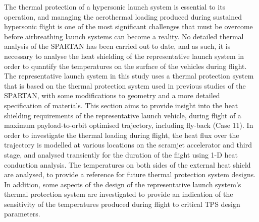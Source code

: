 \noindent
The thermal protection of a hypersonic launch system is essential to its operation, and managing the aerothermal loading produced during sustained hypersonic flight is one of the most significant challenges that must be overcome before airbreathing launch systems can become a reality. No detailed thermal analysis of the SPARTAN has been carried out to date\cite{Preller2018a}, and as such, it is necessary to analyse the heat shielding of the representative launch system in order to quantify the temperatures on the surface of the vehicles during flight. The representative launch system in this study uses a thermal protection system that is based on the thermal protection system used in previous studies of the SPARTAN\cite{Preller2018a}, with some modifications to geometry and a more detailed specification of materials. This section aims to provide insight into the heat shielding requirements of the representative launch vehicle, during flight of a maximum payload-to-orbit optimised trajectory, including fly-back (Case 11). In order to investigate the thermal loading during flight, the heat flux over the trajectory is modelled at various locations on the scramjet accelerator and third stage, and analysed transiently for the duration of the flight using 1-D heat conduction analysis. The temperatures on both sides of the external heat shield are analysed, to provide a reference for future thermal protection system designs. In addition, some aspects of the design of the representative launch system's thermal protection system are investigated to provide an indication of the sensitivity of the temperatures produced during flight to critical TPS design parameters. 





